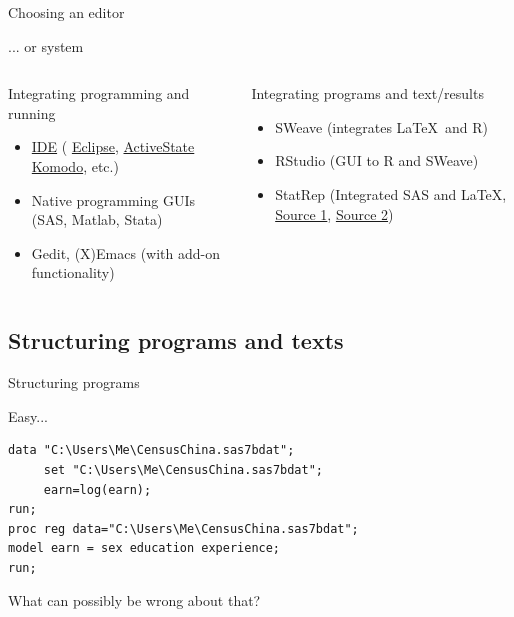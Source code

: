 \documentclass[xcolor=table,compress]{beamer}
\begin{document}
\begin{frame}{Choosing an editor}
\begin{block}{... or system}
\begin{columns}[t]
\begin{column}{.48\textwidth}
\color{blue}
Integrating programming and running
\begin{itemize}
\item \href{http://en.wikipedia.org/wiki/Integrated_development_environment}{IDE} ( \href{http://en.wikipedia.org/wiki/Eclipse_(software)}{Eclipse}, \href{http://en.wikipedia.org/wiki/ActiveState_Komodo}{ActiveState Komodo}, etc.)
\item Native programming GUIs (SAS, Matlab, Stata)
\item Gedit, (X)Emacs (with add-on functionality)
\end{itemize}
\end{column}
\hfill
\begin{column}{.48\textwidth}
\color{blue}
Integrating programs and text/results
\begin{itemize}
\item SWeave (integrates \LaTeX \ and R)
\item RStudio (GUI to R and SWeave)
\item StatRep (Integrated SAS and \LaTeX, \href{http://support.sas.com/resources/papers/proceedings12/324-2012.pdf}{Source 1}, \href{http://support.sas.com/StatRepPackage}{Source 2})
\end{itemize}
\end{column}
\end{columns}
\end{block}
\end{frame}

\subsection[Structure]{Structuring programs and texts}

\begin{frame}[fragile]{Structuring programs}
\begin{block}{Easy...}
\lstset{numbers=left, stepnumber=1,  language=SAS, basicstyle=\tiny,
caption=mystuff.sas}
\begin{lstlisting}
data "C:\Users\Me\CensusChina.sas7bdat";
     set "C:\Users\Me\CensusChina.sas7bdat";
     earn=log(earn);
run;
proc reg data="C:\Users\Me\CensusChina.sas7bdat";
model earn = sex education experience;
run;
\end{lstlisting}
What can possibly be wrong about that?
\end{block}
\end{frame}
\end{document}
